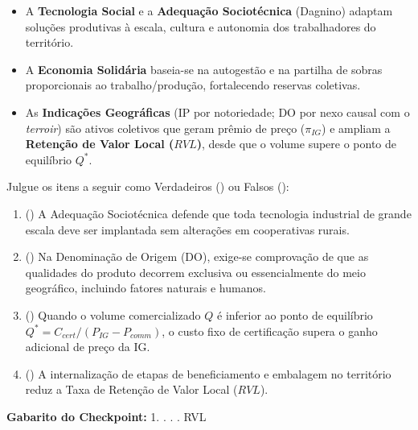 \begin{boxResumo}
\begin{itemize}[leftmargin=1.4em, itemsep=3pt]
  \item A \textbf{Tecnologia Social} e a \textbf{Adequação Sociotécnica} (Dagnino) adaptam soluções produtivas à escala, cultura e autonomia dos trabalhadores do território.
  \item A \textbf{Economia Solidária} baseia-se na autogestão e na partilha de sobras proporcionais ao trabalho/produção, fortalecendo reservas coletivas.
  \item As \textbf{Indicações Geográficas} (IP por notoriedade; DO por nexo causal com o \textit{terroir}) são ativos coletivos que geram prêmio de preço ($\pi_{IG}$) e ampliam a \textbf{Retenção de Valor Local ($RVL$)}, desde que o volume supere o ponto de equilíbrio $Q^*$.
\end{itemize}
\end{boxResumo}

\begin{boxTeste}
Julgue os itens a seguir como Verdadeiros (\V) ou Falsos (\F):
\begin{enumerate}[leftmargin=1.6em, itemsep=3pt]
  \item (\quad) A Adequação Sociotécnica defende que toda tecnologia industrial de grande escala deve ser implantada sem alterações em cooperativas rurais.
  \item (\quad) Na Denominação de Origem (DO), exige-se comprovação de que as qualidades do produto decorrem exclusiva ou essencialmente do meio geográfico, incluindo fatores naturais e humanos.
  \item (\quad) Quando o volume comercializado $Q$ é inferior ao ponto de equilíbrio $Q^* = C_{cert}/(P_{IG} - P_{comm})$, o custo fixo de certificação supera o ganho adicional de preço da IG.
  \item (\quad) A internalização de etapas de beneficiamento e embalagem no território reduz a Taxa de Retenção de Valor Local ($RVL$).
\end{enumerate}
\textbf{Gabarito do Checkpoint:} 1. \F {}. \V {}. \V {}. \F {} RVL\text{)}
\end{boxTeste}
